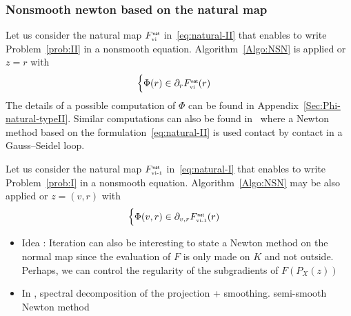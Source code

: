 \subsubsection{Nonsmooth newton based on the natural map }
Let us consider the natural map $F_{{\hbox{\tiny{vi}}}}^{\hbox{\sf \tiny{nat}}}$ in~\eqref{eq:natural-II} that enables to write Problem~\ref{prob:II} in a nonsmooth equation. Algorithm~\ref{Algo:NSN} is applied or $z =r$ with
\begin{equation}
  \label{eq:phiphi}
  \begin{cases}
    \Phi(r) \in \partial_{r} F_{\vitwo}^\nat(r)
  \end{cases}
\end{equation}
 The details of a possible computation of $\Phi$ can be found in Appendix~\ref{Sec:Phi-natural-typeII}.  Similar computations can also be found in~\cite{Joli.Feng2008} where a Newton method based on the formulation~\eqref{eq:natural-II} is used contact by contact in a Gauss--Seidel loop.

Let us consider the natural map $F_{{\hbox{\tiny{vi-1}}}}^{\hbox{\sf \tiny{nat}}}$ in~\eqref{eq:natural-I} that enables to write Problem~\ref{prob:I} in a nonsmooth equation.  Algorithm~\ref{Algo:NSN} may be also applied or $z =(v,r)$ with
\begin{equation}
  \label{eq:phiphi_bis}
  \begin{cases}
    \Phi(v,r) \in \partial_{v,r} F_{\vione}^\nat(r)
  \end{cases}
\end{equation}

\begin{ndrva}
  \begin{itemize}
    \item  Idea : Iteration can also be interesting to state a Newton method
    on the normal map since the evaluation of $F$ is only made on $K$
    and not outside. Perhaps, we can control the regularity of the
    subgradients of $F(P_X(z))$
    \item In \cite{Hayashi.ea_SIOPT2005}, spectral decomposition of the projection + smoothing.  semi-smooth Newton method
  \end{itemize}
\end{ndrva}


